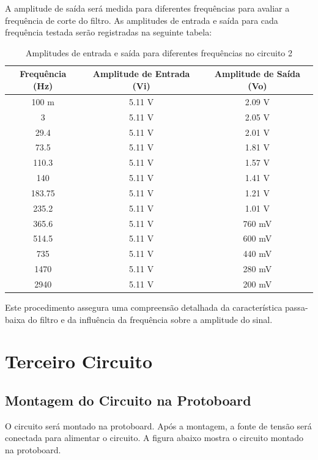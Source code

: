 \documentclass[
	12pt,				%
	openright,			%
	twoside,			%
	a4paper,			%
	english,			%
	french,				%
	spanish,			%
	brazil,				%
	]{abntex2}
\begin{document}
A amplitude de saída será medida para diferentes frequências para avaliar a frequência de corte do filtro. As amplitudes de entrada e saída para cada frequência testada serão registradas na seguinte tabela:

\begin{table}[H]
    \centering
    \begin{tabular}{|c|c|c|}
        \hline
        Frequência (Hz) & Amplitude de Entrada (Vi) & Amplitude de Saída (Vo) \\
        \hline
        100 m & 5.11 V & 2.09 V \\
        3 & 5.11 V & 2.05 V \\
        29.4 & 5.11 V & 2.01 V \\
        73.5 & 5.11 V & 1.81 V \\
        110.3 & 5.11 V & 1.57 V \\
        140 & 5.11 V & 1.41 V \\
        183.75 & 5.11 V & 1.21 V \\
        235.2 & 5.11 V & 1.01 V \\
        365.6 & 5.11 V & 760 mV \\
        514.5 & 5.11 V & 600 mV \\
        735 & 5.11 V & 440 mV \\
        1470 & 5.11 V & 280 mV \\
        2940 & 5.11 V & 200 mV \\
        \hline
    \end{tabular}
    \caption{Amplitudes de entrada e saída para diferentes frequências no circuito 2}
    \label{tab:second_frequency_response}
\end{table}

Este procedimento assegura uma compreensão detalhada da característica passa-baixa do filtro e da influência da frequência sobre a amplitude do sinal.

\section{Terceiro Circuito}

\subsection{Montagem do Circuito na Protoboard}

O circuito será montado na protoboard. Após a montagem, a fonte de tensão será conectada para alimentar o circuito. A figura abaixo mostra o circuito montado na protoboard.
\end{document}
